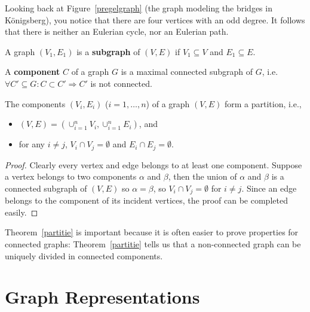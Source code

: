 \begin{example}
Looking back at Figure~\ref{pregelgraph} (the graph modeling the
bridges in K\"onigsberg), you notice that there are four vertices with an
odd degree. It follows that there is neither an Eulerian cycle, nor an Eulerian
path.
\end{example}

\begin{definition}[Subgraph]
  \textup{A graph $(V_1,E_1)$ is a \textbf{subgraph} of $(V,E)$ if
    $V_1 \subseteq V$ and $E_1 \subseteq E$.}
\end{definition}

\begin{definition}
  \textup{A \textbf{component} $C$ of a graph $G$ is a maximal
    connected subgraph of $G$, i.e.
$\forall C' \subseteq G: C \subset C' \Rightarrow C'$ is not connected.}
\end{definition}

 \begin{theorem}
The components $(V_{i},E_{i})$ ($i=1,\ldots,n$) of a graph $(V,E)$
form a partition,
i.e.,\begin{itemize} 
\item
$(V,E) = (\cup_{i=1}^{n} V_{i},\cup_{i=1}^{n} E_{i})$, and
\item
for any $i \neq j$, $V_{i} \cap V_{j} = \emptyset$ and $E_{i} \cap E_{j} = \emptyset$.
\end{itemize}
\end{theorem}
\begin{proof}
Clearly every vertex and edge belongs to at least one component.
Suppose a vertex belongs to two components $\alpha$ and $\beta$, then
the union of $\alpha$ and $\beta$ is a connected subgraph of $(V,E)$
so $\alpha = \beta$, so $V_{i} \cap V_{j} = \emptyset$ for $i \neq
j$. Since an edge belongs to the component of its incident vertices,
the proof can be completed easily.
\end{proof}


Theorem~\ref{partitie} is important because it is often easier to
prove properties for connected graphs: Theorem~\ref{partitie} tells us
that a non-connected graph can be uniquely divided in connected
components.


\section{Graph Representations \label{voorstelgraph}}

